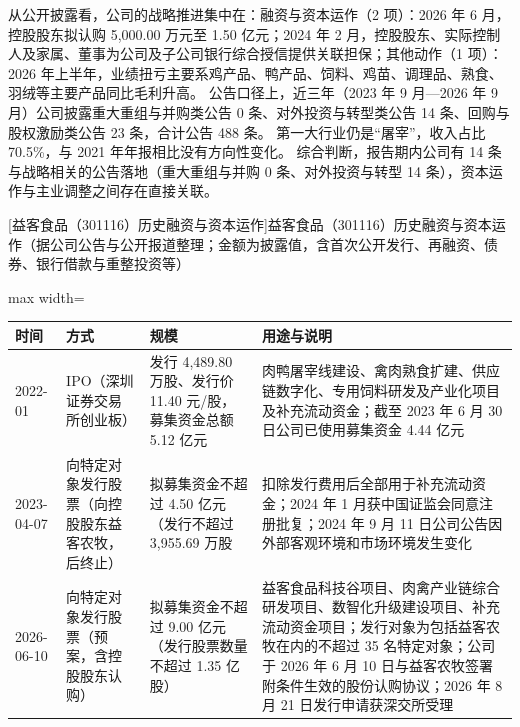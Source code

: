  从公开披露看，公司的战略推进集中在：融资与资本运作（2 项）：2026 年 6 月，控股股东拟认购 5,000.00 万元至 1.50 亿元；2024 年 2 月，控股股东、实际控制人及家属、董事为公司及子公司银行综合授信提供关联担保；其他动作（1 项）：2026 年上半年，业绩扭亏主要系鸡产品、鸭产品、饲料、鸡苗、调理品、熟食、羽绒等主要产品同比毛利升高。 公告口径上，近三年（2023 年 9 月---2026 年 9 月）公司披露重大重组与并购类公告 0 条、对外投资与转型类公告 14 条、回购与股权激励类公告 23 条，合计公告 488 条。 第一大行业仍是“屠宰”，收入占比 70.5\%，与 2021 年年报相比没有方向性变化。 综合判断，报告期内公司有 14 条与战略相关的公告落地（重大重组与并购 0 条、对外投资与转型 14 条），资本运作与主业调整之间存在直接关联。

\begin{center}\small\setlength{\tabcolsep}{4pt}
[益客食品（301116）历史融资与资本运作]{益客食品（301116）历史融资与资本运作（据公司公告与公开报道整理；金额为披露值，含首次公开发行、再融资、债券、银行借款与重整投资等）}
\begin{adjustbox}{max width=\textwidth}
\begin{tabular}{@{}p{1.45cm}p{2.55cm}p{4.05cm}p{4.95cm}@{}}
\toprule
时间 & 方式 & 规模 & 用途与说明 \\
\midrule
2022-01 & IPO（深圳证券交易所创业板） & 发行 4,\allowbreak{}489.80 万股、\allowbreak{}发行价 11.40 元/\allowbreak{}股，\allowbreak{}募集资金总额 5.12 亿元 & 肉鸭屠宰线建设、\allowbreak{}禽肉熟食扩建、\allowbreak{}供应链数字化、\allowbreak{}专用饲料研发及产业化项目及补充流动资金；截至 2023 年 6 月 30 日公司已使用募集资金 4.44 亿元 \\
2023-04-07 & 向特定对象发行股票（向控股股东益客农牧，后终止） & 拟募集资金不超过 4.50 亿元（发行不超过 3,\allowbreak{}955.69 万股 & 扣除发行费用后全部用于补充流动资金；2024 年 1 月获中国证监会同意注册批复；2024 年 9 月 11 日公司公告因外部客观环境和市场环境发生变化 \\
2026-06-10 & 向特定对象发行股票（预案，含控股股东认购） & 拟募集资金不超过 9.00 亿元（发行股票数量不超过 1.35 亿股） & 益客食品科技谷项目、\allowbreak{}肉禽产业链综合研发项目、\allowbreak{}数智化升级建设项目、\allowbreak{}补充流动资金项目；发行对象为包括益客农牧在内的不超过 35 名特定对象；公司于 2026 年 6 月 10 日与益客农牧签署附条件生效的股份认购协议；2026 年 8 月 21 日发行申请获深交所受理 \\
\bottomrule
\end{tabular}
\end{adjustbox}
\end{center}

